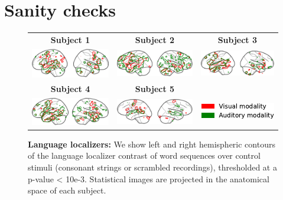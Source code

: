 \section{Sanity checks}\label{sec:sanity_checks}

\begin{figure}[ht]
\scriptsize
\hspace{-4ex}
\begin{tabular}{ccc}
\textbf{\Large Subject 1} & \textbf{\Large Subject 2} & \textbf{\Large Subject 3}\\
{\includegraphics[width=.33\linewidth]{figures/part_II/langloc_01.pdf}}
\hspace{-1ex}
&{\includegraphics[width=.33\linewidth]{figures/part_II/langloc_03.pdf}}
\hspace{-1ex}
&{\includegraphics[width=.33\linewidth]{figures/part_II/langloc_04.pdf}}
\hspace{-1ex}\\
\rule{0pt}{6ex}
\textbf{\Large Subject 4} & \textbf{\Large Subject 5} & {}\\
{\includegraphics[width=.33\linewidth]{figures/part_II/langloc_05.pdf}}
\hspace{-1ex}
&{\includegraphics[width=.33\linewidth]{figures/part_II/langloc_06.pdf}}
\hspace{-1ex}
&{\includegraphics[width=.2\linewidth]{figures/part_II/langloc_legend.pdf}}
\hspace{-1ex} \\
\end{tabular}
\vspace{0ex}
\caption{\textbf{Language localizers:} We show left and right hemispheric contours of the language localizer contrast of word sequences over control stimuli (consonant strings or scrambled recordings), thresholded at a p-value < 10e-3.
Statistical images are projected in the anatomical space of each subject.}
\label{fig:language_localizers}
\end{figure}

